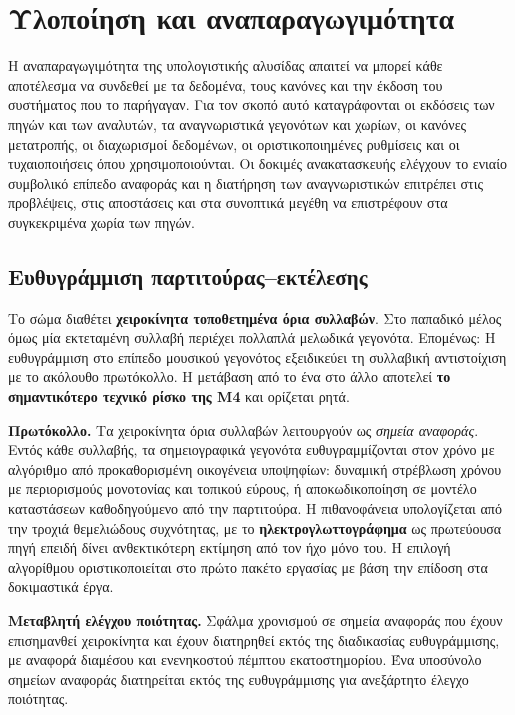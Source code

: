 \documentclass[11pt,a4paper]{article}
\begin{document}
\section{Υλοποίηση και αναπαραγωγιμότητα}\label{app:impl}

Η αναπαραγωγιμότητα της υπολογιστικής αλυσίδας απαιτεί να μπορεί κάθε αποτέλεσμα να συνδεθεί με τα δεδομένα, τους κανόνες και την έκδοση του συστήματος που το παρήγαγαν. Για τον σκοπό αυτό καταγράφονται οι εκδόσεις των πηγών και των αναλυτών, τα αναγνωριστικά γεγονότων και χωρίων, οι κανόνες μετατροπής, οι διαχωρισμοί δεδομένων, οι οριστικοποιημένες ρυθμίσεις και οι τυχαιοποιήσεις όπου χρησιμοποιούνται. Οι δοκιμές ανακατασκευής ελέγχουν το ενιαίο συμβολικό επίπεδο αναφοράς και η διατήρηση των αναγνωριστικών επιτρέπει στις προβλέψεις, στις αποστάσεις και στα συνοπτικά μεγέθη να επιστρέφουν στα συγκεκριμένα χωρία των πηγών.

\subsection{Ευθυγράμμιση παρτιτούρας--εκτέλεσης}\label{app:impl-align}

Το σώμα διαθέτει \textbf{χειροκίνητα τοποθετημένα όρια συλλαβών}. Στο παπαδικό μέλος όμως μία εκτεταμένη συλλαβή περιέχει πολλαπλά μελωδικά γεγονότα. Επομένως:
Η ευθυγράμμιση στο επίπεδο μουσικού γεγονότος εξειδικεύει τη συλλαβική αντιστοίχιση με το ακόλουθο πρωτόκολλο.
Η μετάβαση από το ένα στο άλλο αποτελεί \textbf{το σημαντικότερο τεχνικό ρίσκο της M4} και ορίζεται ρητά.

\textbf{Πρωτόκολλο.} Τα χειροκίνητα όρια συλλαβών λειτουργούν ως \emph{σημεία αναφοράς}. Εντός κάθε συλλαβής, τα σημειογραφικά γεγονότα ευθυγραμμίζονται στον χρόνο με αλγόριθμο από προκαθορισμένη οικογένεια υποψηφίων: δυναμική στρέβλωση χρόνου με περιορισμούς μονοτονίας και τοπικού εύρους, ή αποκωδικοποίηση σε μοντέλο καταστάσεων καθοδηγούμενο από την παρτιτούρα. Η πιθανοφάνεια υπολογίζεται από την τροχιά θεμελιώδους συχνότητας, με το \textbf{ηλεκτρογλωττογράφημα} ως πρωτεύουσα πηγή επειδή δίνει ανθεκτικότερη εκτίμηση από τον ήχο μόνο του. Η επιλογή αλγορίθμου οριστικοποιείται στο πρώτο πακέτο εργασίας με βάση την επίδοση στα δοκιμαστικά έργα.

\textbf{Μεταβλητή ελέγχου ποιότητας.} Σφάλμα χρονισμού σε σημεία αναφοράς που έχουν επισημανθεί χειροκίνητα και έχουν διατηρηθεί εκτός της διαδικασίας ευθυγράμμισης, με αναφορά διαμέσου και ενενηκοστού πέμπτου εκατοστημορίου. Ένα υποσύνολο σημείων αναφοράς διατηρείται εκτός της ευθυγράμμισης για ανεξάρτητο έλεγχο ποιότητας.
\end{document}

